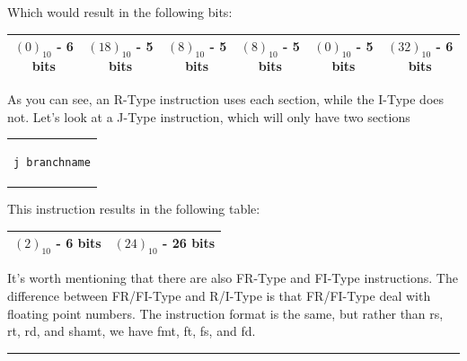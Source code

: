 \documentclass{article}
\begin{document}
\noindent Which would result in the following bits: 
\begin{center}
\begin{tabular}{|c|c|c|c|c|c|}
\hline
$(0)_{10}$ - 6 bits & $(18)_{10}$ - 5 bits & $(8)_{10}$ - 5 bits & $(8)_{10}$ - 5 bits & $(0)_{10}$ - 5 bits & $(32)_{10}$ - 6 bits \\ \hline
\end{tabular}
\end{center}
\noindent As you can see, an R-Type instruction uses each section, while the I-Type does not. Let's look at a J-Type instruction, which will only have two sections
\begin{center} 
\begin{tabular}{c}
\begin{lstlisting}
j branchname
\end{lstlisting}
\end{tabular}
\end{center}
\noindent This instruction results in the following table:
\begin{center}
\begin{tabular}{|c|c|c|c|c|c|}
\hline
$(2)_{10}$ - 6 bits &  \multicolumn{5}{|c|}{$(24)_{10}$ - 26 bits}\\ \hline
\end{tabular}
\end{center}
\noindent It's worth mentioning that there are also FR-Type and FI-Type instructions. The difference between FR/FI-Type and R/I-Type is that FR/FI-Type deal with floating point numbers. The instruction format is the same, but rather than rs, rt, rd, and shamt, we have fmt, ft, fs, and fd. \\
\hrule
\noindent \\
\end{document}
